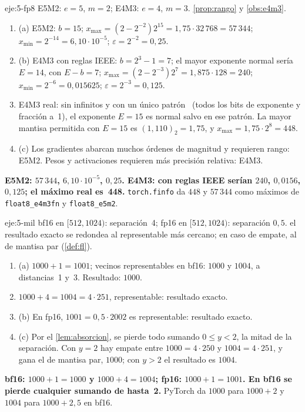 \begin{solucion}{eje:5-fp8}
\datos E5M2: $e=5$, $m=2$; E4M3: $e=4$, $m=3$.
\planteamiento \cref{prop:rango} y \cref{obs:e4m3}.
\pasos
\begin{enumerate}[label=\arabic*.]
  \item (a) E5M2: $b=15$; $x_{\max}=(2-2^{-2})2^{15}=1{,}75\cdot 32\,768=57\,344$; $x_{\min}=2^{-14}=6{,}10\cdot 10^{-5}$; $\varepsilon=2^{-2}=0{,}25$.
  \item (b) E4M3 con reglas IEEE: $b=2^{3}-1=7$; el mayor exponente normal sería $E=14$, con $E-b=7$; $x_{\max}=(2-2^{-3})2^{7}=1{,}875\cdot 128=240$; $x_{\min}=2^{-6}=0{,}015625$; $\varepsilon=2^{-3}=0{,}125$.
  \item E4M3 real: sin infinitos y con un único patrón \NaN\ (todos los bits de exponente y fracción a~1), el exponente $E=15$ es normal salvo en ese patrón. La mayor mantisa permitida con $E=15$ es $(1{,}110)_2=1{,}75$, y $x_{\max}=1{,}75\cdot 2^{8}=448$.
  \item (c) Los gradientes abarcan muchos órdenes de magnitud y requieren rango: E5M2. Pesos y activaciones requieren más precisión relativa: E4M3.
\end{enumerate}
\resultado \textbf{E5M2: $57\,344$, $6{,}10\cdot 10^{-5}$, $0{,}25$. E4M3: con reglas IEEE serían $240$, $0{,}0156$, $0{,}125$; el máximo real es~448.}
\comprobacion \texttt{torch.finfo} da $448$ y $57\,344$ como máximos de \texttt{float8\_e4m3fn} y \texttt{float8\_e5m2}.
\end{solucion}

\begin{solucion}{eje:5-mil}
\datos bf16 en $[512,1024)$: separación~4; fp16 en $[512,1024)$: separación $0{,}5$.
\planteamiento el resultado exacto se redondea al representable más cercano; en caso de empate, al de mantisa par (\cref{def:fl}).
\pasos
\begin{enumerate}[label=\arabic*.]
  \item (a) $1000+1=1001$; vecinos representables en bf16: $1000$ y $1004$, a distancias~1 y~3. Resultado: $1000$.
  \item $1000+4=1004=4\cdot 251$, representable: resultado exacto.
  \item (b) En fp16, $1001=0{,}5\cdot 2002$ es representable: resultado exacto.
  \item (c) Por el \cref{lem:absorcion}, se pierde todo sumando $0\le y<2$, la mitad de la separación. Con $y=2$ hay empate entre $1000=4\cdot 250$ y $1004=4\cdot 251$, y gana el de mantisa par, $1000$; con $y>2$ el resultado es $1004$.
\end{enumerate}
\resultado \textbf{bf16: $1000+1=1000$ y $1000+4=1004$; fp16: $1000+1=1001$. En bf16 se pierde cualquier sumando de hasta~2.}
\comprobacion PyTorch da $1000$ para $1000+2$ y $1004$ para $1000+2{,}5$ en bf16.
\end{solucion}

